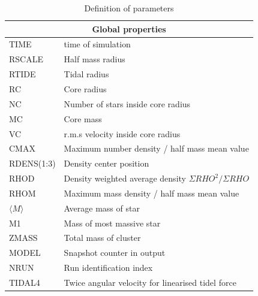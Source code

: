 \begin{longtable}{|p{0.7in}|p{4.3in}|}
  \caption{Definition of parameters}
  \\\hline
    \multicolumn{2}{|c|}{ Global properties} \\\hline
    TIME   & time of simulation \\\hline
    RSCALE & Half mass radius\\\hline
    RTIDE  & Tidal radius\\\hline
    RC     & Core radius \\\hline
    NC     & Number of stars inside core radius \\\hline
    MC     & Core mass \\\hline
    VC     & r.m.s velocity inside core radius \\\hline
    CMAX   & Maximum number density / half mass mean value \\\hline
    RDENS(1:3)  & Density center position \\\hline
    RHOD   & Density weighted average density $\Sigma RHO^2 / \Sigma RHO$ \\\hline
    RHOM   & Maximum mass density / half mass mean value \\\hline
    $\langle M\rangle$    & Average mass of star\\\hline
    M1     & Mass of most massive star\\\hline
    ZMASS  & Total mass of cluster \\\hline
    MODEL  & Snapshot counter in output\\\hline
    NRUN   & Run identification index \\\hline
    TIDAL4 & Twice angular velocity for linearised tidel force\\\hline
    \hline


\end{longtable}
